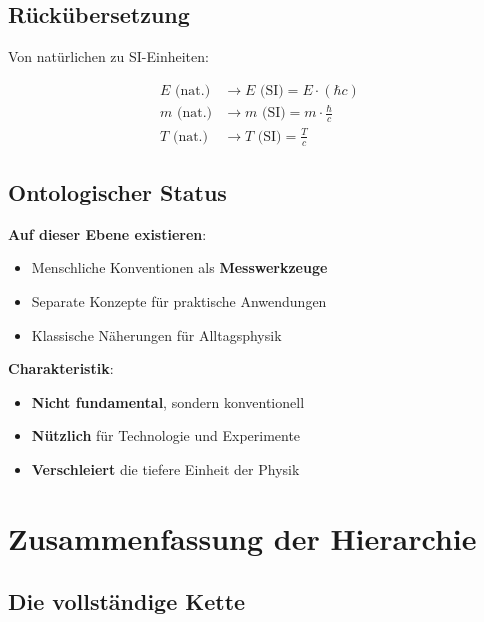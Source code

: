 \subsection{Rückübersetzung}

Von natürlichen zu SI-Einheiten:

\begin{align}
E \text{ (nat.)} &\to E \text{ (SI)} = E \cdot (\hbar c) \\
m \text{ (nat.)} &\to m \text{ (SI)} = m \cdot \frac{\hbar}{c} \\
T \text{ (nat.)} &\to T \text{ (SI)} = \frac{T}{c}
\end{align}

\subsection{Ontologischer Status}

\textbf{Auf dieser Ebene existieren}:
\begin{itemize}
\item Menschliche Konventionen als \textbf{Messwerkzeuge}
\item Separate Konzepte für praktische Anwendungen
\item Klassische Näherungen für Alltagsphysik
\end{itemize}

\textbf{Charakteristik}:
\begin{itemize}
\item \textbf{Nicht fundamental}, sondern konventionell
\item \textbf{Nützlich} für Technologie und Experimente
\item \textbf{Verschleiert} die tiefere Einheit der Physik
\end{itemize}

\section{Zusammenfassung der Hierarchie}

\subsection{Die vollständige Kette}

\begin{table}[h]
\centering
\small
{}
\caption{Die fünf ontologischen Ebenen}
\end{table}

